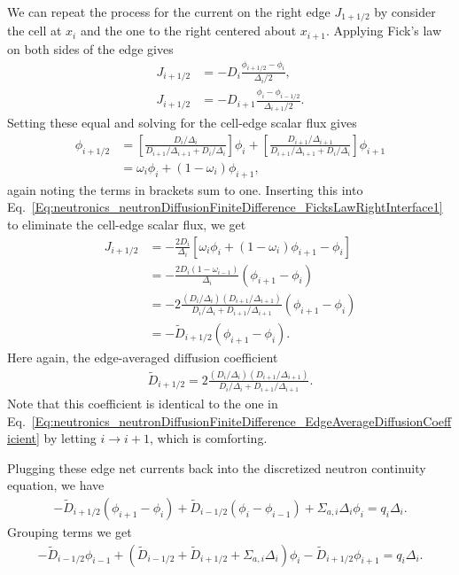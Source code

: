 We can repeat the process for the current on the right edge $J_{1+1/2}$ by consider the cell at $x_i$ and the one to the right centered about $x_{i+1}$. Applying Fick's law on both sides of the edge gives
\begin{subequations}
\begin{align}
  J_{i+1/2} &= -D_{i}   \frac{ \phi_{i+1/2} - \phi_{i} 		}{ \Delta_{i}/2 	}, \label{Eq:neutronics_neutronDiffusionFiniteDifference_FicksLawRightInterface1} \\
  J_{i+1/2} &= -D_{i+1} \frac{ \phi_{i} 	- \phi_{i-1/2}  }{ \Delta_{i+1}/2 	}.
\end{align}
\end{subequations}
Setting these equal and solving for the cell-edge scalar flux gives
\begin{align}
  \phi_{i+1/2} &=  \left[ \frac{ D_i / \Delta_i }{ D_{i+1}/\Delta_{i+1} + D_{i}/\Delta_{i} } \right] \phi_i + \left[ \frac{ D_{i+1} / \Delta_{i+1} }{ D_{i+1}/\Delta_{i+1} + D_{i}/\Delta_{i} } \right] \phi_{i+1} \nonumber \\
  &= \omega_i \phi_i + ( 1 - \omega_i ) \phi_{i+1},
\end{align}
again noting the terms in brackets sum to one. Inserting this into Eq.~\eqref{Eq:neutronics_neutronDiffusionFiniteDifference_FicksLawRightInterface1} to eliminate the cell-edge scalar flux, we get
\begin{align}
  J_{i+1/2} &= -\frac{2 D_{i}}{\Delta_i} \left[ \omega_i \phi_i + ( 1 - \omega_i ) \phi_{i+1} - \phi_{i}  \right] \nonumber \\
  			&= -\frac{2 D_{i} ( 1- \omega_{i-1} ) }{\Delta_i} ( \phi_{i+1} - \phi_i ) \nonumber \\
			&= -2 \frac{ ( D_{i} / \Delta_{i} ) ( D_{i+1} / \Delta_{i+1} ) }{ D_{i} / \Delta_{i} + D_{i+1} / \Delta_{i+1} } ( \phi_{i+1} - \phi_{i} ) \nonumber \\
			&= -\widetilde{D}_{i+1/2} ( \phi_{i+1} - \phi_{i} ) .
\end{align}
Here again, the edge-averaged diffusion coefficient
\begin{align}
  \widetilde{D}_{i+1/2} = 2 \frac{ ( D_{i} / \Delta_{i} ) ( D_{i+1} / \Delta_{i+1} ) }{ D_{i} / \Delta_{i} + D_{i+1} / \Delta_{i+1} } .
\end{align}
Note that this coefficient is identical to the one in Eq.~\eqref{Eq:neutronics_neutronDiffusionFiniteDifference_EdgeAverageDiffusionCoefficient} by letting $i \rightarrow i+1$, which is comforting.

Plugging these edge net currents back into the discretized neutron continuity equation, we have
\begin{align}
  -\widetilde{D}_{i+1/2} ( \phi_{i+1} - \phi_{i} ) + \widetilde{D}_{i-1/2} ( \phi_i - \phi_{i-1} )  + \Sigma_{a,i} \Delta_i \phi_i = q_i \Delta_i .
\end{align}
Grouping terms we get
\begin{align}
 -\widetilde{D}_{i-1/2} \phi_{i-1} + \left( \widetilde{D}_{i-1/2} + \widetilde{D}_{i+1/2}  + \Sigma_{a,i} \Delta_i \right) \phi_i - \widetilde{D}_{i+1/2} \phi_{i+1}  = q_i \Delta_i .
\end{align}

